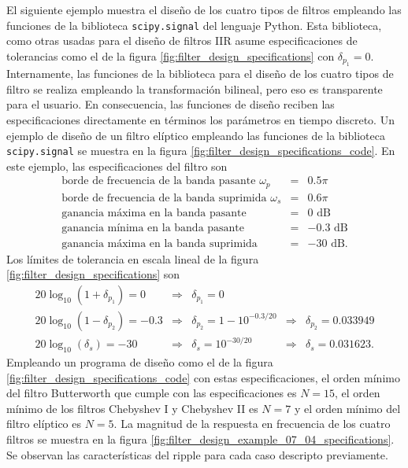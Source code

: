 \documentclass[a4paper]{report}
\begin{document}
El siguiente ejemplo muestra el diseño de los cuatro tipos de filtros empleando las funciones de la biblioteca \texttt{scipy.signal} del lenguaje Python. Esta biblioteca, como otras usadas para el diseño de filtros IIR asume especificaciones de tolerancias como el de la figura \ref{fig:filter_design_specifications} con \(\delta_{p_1}=0\). Internamente, las funciones de la biblioteca para el diseño de los cuatro tipos de filtro se realiza empleando la transformación bilineal, pero eso es transparente para el usuario. En consecuencia, las funciones de diseño reciben las especificaciones directamente en términos los parámetros en tiempo discreto. Un ejemplo de diseño de un filtro elíptico empleando las funciones de la biblioteca \texttt{scipy.signal} se muestra en la figura \ref{fig:filter_design_specifications_code}. En este ejemplo, las especificaciones del filtro son
\begin{equation}\label{eq:filter_design_example_07_04_specifications}
 \begin{array}{lcl}
  \textrm{borde de frecuencia de la banda pasante }\omega_p & = & 0.5\pi\\
  \textrm{borde de frecuencia de la banda suprimida }\omega_s & = & 0.6\pi\\
  \textrm{ganancia máxima en la banda pasante}& = & 0\textrm{ dB}\\
  \textrm{ganancia mínima en la banda pasante} & = & -0.3\textrm{ dB}\\
  \textrm{ganancia máxima en la banda suprimida} & = & -30\textrm{ dB}.
 \end{array} 
\end{equation}
Los límites de tolerancia en escala lineal de la figura \ref{fig:filter_design_specifications} son 
\[
 \begin{array}{lclcl}
  20\log_{10}(1+\delta_{p_1})=0 & \Rightarrow & \delta_{p_1}=0\\
  20\log_{10}(1-\delta_{p_2})=-0.3 & \Rightarrow & \delta_{p_2}=1-10^{-0.3/20} & \Rightarrow & \delta_{p_2}=0.033949\\
  20\log_{10}(\delta_s)=-30 & \Rightarrow & \delta_s=10^{-30/20} & \Rightarrow & \delta_s=0.031623.
 \end{array}
\] 
Empleando un programa de diseño como el de la figura \ref{fig:filter_design_specifications_code} con estas especificaciones, el orden mínimo del filtro Butterworth que cumple con las especificaciones es \(N=15\), el orden mínimo de los filtros Chebyshev I y Chebyshev II es \(N=7\) y el orden mínimo del filtro elíptico es \(N=5\). La magnitud de la respuesta en frecuencia de los cuatro filtros se muestra en la figura \ref{fig:filter_design_example_07_04_specifications}. Se observan las características del ripple para cada caso descripto previamente.
\end{document}
